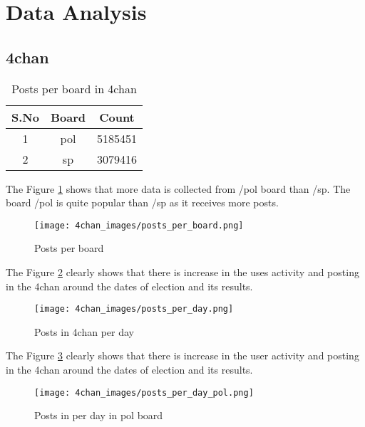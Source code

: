 \documentclass[sigconf]{acmart}
\begin{document}
\section{Data Analysis}
\subsection{4chan}

\begin{table}[h]
    \centering
    \begin{tabular}{|c|c|c|}
        \hline
        \textbf{S.No} & \textbf{Board} & \textbf{Count} \\
        \hline
         1 & pol & 5185451 \\
        \hline
         2 & sp & 3079416 \\
        \hline
    \end{tabular}
    \caption{Posts per board in 4chan}
    \label{tab:sample_table}
\end{table}

The Figure \ref{fig:4chan_images/posts_per_board} shows that more data is collected from /pol board than /sp. The board /pol is quite popular than /sp as it receives more posts.\newline
\begin{figure}[h]
    \centering
    \texttt{[image: 4chan\_images/posts\_per\_board.png]} %
    \caption{Posts per board}
    \label{fig:4chan_images/posts_per_board}
\end{figure}


The Figure \ref{fig:4chan_images/posts_per_day} clearly shows that there is increase in the uses activity and posting in the 4chan around the dates of election and its results.\newline
\begin{figure}[h]
    \centering
    \texttt{[image: 4chan\_images/posts\_per\_day.png]} %
    \caption{Posts in 4chan per day}
    \label{fig:4chan_images/posts_per_day}
\end{figure}

The Figure \ref{fig:4chan_images/posts_per_day_pol} clearly shows that there is increase in the user activity and posting in the 4chan around the dates of election and its results.\newline
\begin{figure}[h]
    \centering
    \texttt{[image: 4chan\_images/posts\_per\_day\_pol.png]} %
    \caption{Posts in per day in pol board}
    \label{fig:4chan_images/posts_per_day_pol}
\end{figure}
\end{document}
